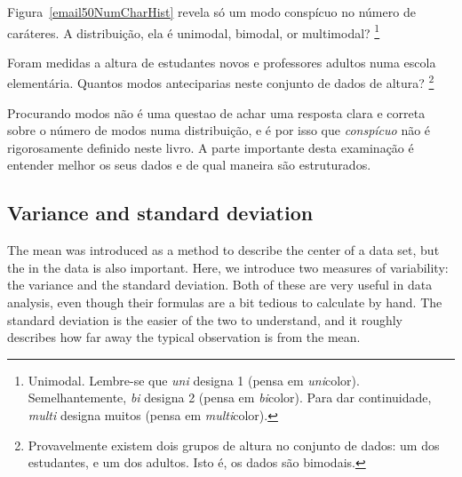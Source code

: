 \begin{exercise}
 Figura~\ref{email50NumCharHist} revela só um modo conspícuo no número de caráteres.
 A distribuição, ela é unimodal, bimodal, or multimodal?
 \footnote{Unimodal.
  Lembre-se que \emph{uni} designa 1 (pensa em \emph{uni}color).
  Semelhantemente, \emph{bi} designa 2 (pensa em \emph{bi}color).
  Para dar continuidade, \emph{multi} designa muitos (pensa em \emph{multi}color).
 }
\end{exercise}

\begin{exercise}
 Foram medidas a altura de estudantes novos e professores adultos numa escola elementária.
 Quantos modos anteciparias neste conjunto de dados de altura?
 \footnote{Provavelmente existem dois grupos de altura no conjunto de dados:
  um dos estudantes, e um dos adultos.
 Isto é, os dados são bimodais.}
\end{exercise}

\begin{tipBox}{
  Procurando modos não é uma questao de achar uma resposta clara e correta sobre o número de modos numa distribuição, e é por isso que \emph{conspícuo} não é rigorosamente definido neste livro.
 A parte importante desta examinação é entender melhor os seus dados e de qual maneira são estruturados.}
\end{tipBox}

\subsection{Variance and standard deviation}
\label{variability}

The mean was introduced as a method to describe the center of a data set, but the  in the data is also important. Here, we introduce two measures of variability: the variance and the standard deviation. Both of these are very useful in data analysis, even though their formulas are a bit tedious to calculate by hand. The standard deviation is the easier of the two to understand, and it roughly describes how far away the typical observation is from the mean.

